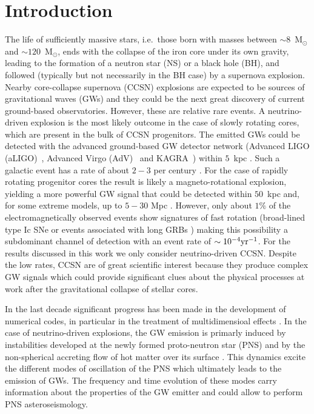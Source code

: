 
\section{Introduction}


The life of sufficiently massive stars, i.e.~those born with masses between $\sim 8$~M$_\odot$ and $\sim 120$~M$_\odot$, ends with the collapse of {the} iron core under {its} own gravity, leading {to} the formation of a neutron star {(NS)} or a black hole (BH), {and} followed (typically but not necessarily in the BH case) by {a supernova} explosion. Nearby core-collapse supernova (CCSN) explosions are expected to be sources of gravitational waves (GWs) and they could be 
the next great discovery of current ground-based observatories. However, these are relative rare events. A neutrino-driven explosion \citep{Bethe:1990} is the most likely outcome in the case of slowly rotating cores, which are present in the bulk of CCSN progenitors. The emitted GWs could be detected with the advanced ground-based GW detector network (Advanced LIGO (aLIGO)~\citep{TheLIGOScientific:2014jea}, Advanced Virgo (AdV)~\citep{TheVirgo:2014hva} and
KAGRA~\citep{Aso:2013eba}) within $5$~kpc \citep{Gossan:2016,TargetedSNSearchO12}. Such a galactic event has a rate of about $2-3$ per century \citep{Adams:2013,Rozwadowska:2021}.
For the case of rapidly rotating progenitor cores the result is likely a magneto-rotational explosion, yielding  a more powerful GW signal that could be detected within $50$~kpc and, for some extreme models, up to $5-30$ Mpc \citep{Gossan:2016,TargetedSNSearchO12}. However, only about $1\%$ of the electromagnetically observed events show signatures of fast rotation (broad-lined type Ic SNe \citep{Li:2011b} or events associated with long GRBs 
\citep{Chapman:2007}) making this possibility a subdominant channel of detection with an event rate of $\sim 10^{-4} \rm{yr}^{-1}$. For the results discussed in this work we only consider neutrino-driven CCSN.  Despite the low rates, CCSN are of great scientific interest because they produce complex GW signals which could provide significant clues about the physical processes at work after the gravitational collapse of stellar cores. 

In the last decade significant progress has been made in the development of numerical codes, {in particular in the treatment of multidimensioal effects \citep{BMueller:2020}.} In the case of  neutrino-driven explosions, the GW emission is {primarly induced by instabilities developed at the newly formed proto-neutron star (PNS) and by the non-spherical accreting flow of hot matter over its surface \citep{Kotake:2017}.  This} dynamics excite the different modes of oscillation of the PNS which ultimately leads to the emission of GWs. The frequency and time evolution of these modes carry information about the properties of the GW emitter and could allow to perform PNS asteroseismology. 


